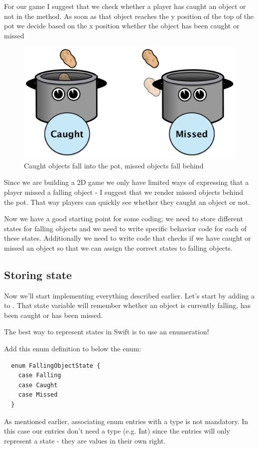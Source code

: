 For our game I suggest that we check whether a player has caught an object or
not in the  method. As soon as that object reaches the y
position of the top of the pot we decide based on the x position whether the
object has been caught or missed 
\begin{figure}[H]
		\centering
		\includegraphics[width=0.3\linewidth]{images/Chapter3/catch_test.png}
		\caption{Caught objects fall into the pot, missed objects fall behind}
		\label{CaughtMissedDefinition}
\end{figure}
Since we are building a 2D game we only have limited ways of expressing that a
player missed a falling object - I suggest that we render missed objects behind
the pot. That way players can quickly see whether they caught an object or not.

Now we have a good starting point for some coding; we need to store
different states for falling objects and we need to write specific behavior
code for each of these states. Additionally we need to write code that checks if
we have caught or missed an object so that we can assign the correct states to
falling objects.

\subsection{Storing state}
Now we'll start implementing everything described earlier. Let's start by adding
a  to . That state
variable will remember whether an object is currently falling, has been caught
or has been missed.

The best way to represent states in Swift is to use an enumeration!
\begin{leftbar}
Add this enum definition to  below the
 enum:
\begin{lstlisting}
  enum FallingObjectState {
    case Falling
    case Caught
    case Missed
  }
\end{lstlisting}
\end{leftbar}
As mentioned earlier, associating enum entries with a type is not
mandatory. In this case our entries don't need a type (e.g. Int) since the
entries will only represent a state - they are values in their own right.


